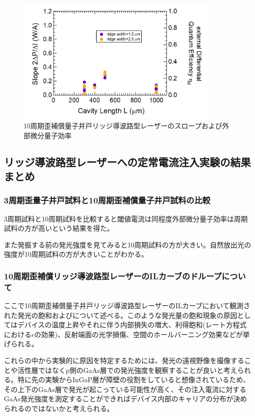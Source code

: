 {\begin{figure}[ht]
	\centering
	\includegraphics[width=10cm]{figure/fig_3_2_10QW_ridge_slope.png}
		\caption{10周期歪補償量子井戸リッジ導波路型レーザーのスロープおよび外部微分量子効率}
		\label{fig:fig_3_2_10QW_ridge_slope}
\end{figure}

\subsection{リッジ導波路型レーザーへの定常電流注入実験の結果まとめ}
\subsubsection{3周期歪量子井戸試料と10周期歪補償量子井戸試料の比較}
3周期試料と10周期試料を比較すると閾値電流は同程度外部微分量子効率は周期試料の方が高いという結果を得た。

また発振する前の発光強度を見てみると10周期試料の方が大きい。自然放出光の強度が10周期試料の方が大きいことがわかる。
\subsubsection{10周期歪補償リッジ導波路型レーザーのILカーブのドループについて}
ここで10周期歪補償量子井戸リッジ導波路型レーザーのILカーブにおいて観測された発光の飽和およびについて述べる。このような発光量の飽和現象の原因としてはデバイスの温度上昇やそれに伴う内部損失の増大、利得飽和(レート方程式における$\epsilon$の効果)、反射端面の光学損傷、空間のホールバーニング効果などが挙げられる。

これらの中から実験的に原因を特定するためには、発光の遠視野像を撮像することや活性層ではなくp側のGaAs層での発光強度を観察することが良いと考えられる。特に先の実験からInGaP層が障壁の役割をしていると想像されているため、その上下のGaAs層で発光が起こっている可能性が高く、その注入電流に対するGaAs発光強度を測定することができればデバイス内部のキャリアの分布が決められるのではないかと考えられる。

}
